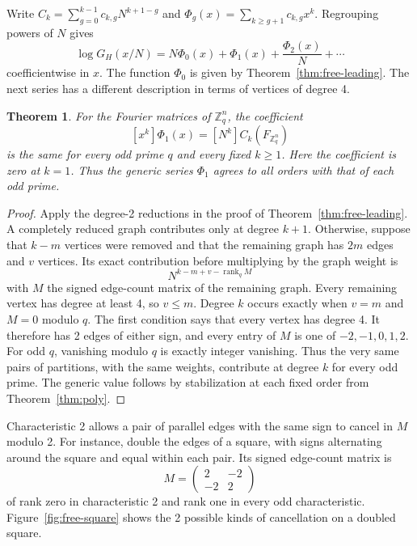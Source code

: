\documentclass[11pt,a4paper]{article}
\newtheorem{thm}{Theorem}[section]
\theoremstyle{remark}
\begin{document}
Write $C_k=\sum_{g=0}^{k-1}c_{k,g}N^{k+1-g}$ and
$\Phi_g(x)=\sum_{k\geq g+1}c_{k,g}x^k$. Regrouping powers of $N$ gives
\[
 \log G_H(x/N)=N\Phi_0(x)+\Phi_1(x)+\frac{\Phi_2(x)}N+\cdots
\]
coefficientwise in $x$. The function $\Phi_0$ is given by
Theorem~\ref{thm:free-leading}. The next series has a different
description in terms of vertices of degree 4.

\begin{samepage}
\begin{thm}\label{thm:free-odd}
For the Fourier matrices of $\mathbb Z_q^n$, the coefficient
\[
 [x^k]\Phi_1(x)=[N^k]C_k(F_{\mathbb Z_q^n})
\]
is the same for every odd prime $q$ and every fixed $k\geq1$.
Here the coefficient is zero at $k=1$. Thus the generic series $\Phi_1$
agrees to all orders with that of each odd prime.
\end{thm}
\end{samepage}
\begin{proof}
Apply the degree-2 reductions in the proof of
Theorem~\ref{thm:free-leading}. A completely reduced graph contributes
only at degree $k+1$. Otherwise, suppose that $k-m$ vertices were removed
and that the remaining graph has $2m$ edges and $v$ vertices. Its exact
contribution before multiplying by the graph weight is
\[
 N^{k-m+v-\operatorname{rank}_q M}
\]
with $M$ the signed edge-count matrix of the remaining graph.
Every remaining vertex has degree at least 4, so $v\leq m$.
Degree $k$ occurs exactly when $v=m$ and $M=0$ modulo $q$.
The first condition says that every vertex has degree 4. It therefore
has 2 edges of either sign, and every entry of $M$ is one of
$-2,-1,0,1,2$. For odd $q$, vanishing modulo $q$ is exactly integer
vanishing. Thus the very same pairs of partitions, with the same weights,
contribute at degree $k$ for every odd prime. The generic value follows
by stabilization at each fixed order from Theorem~\ref{thm:poly}.
\end{proof}

Characteristic 2 allows a pair of parallel edges with the same sign
to cancel in $M$ modulo 2. For instance, double the edges of a square,
with signs alternating around the square and equal within each pair.
Its signed edge-count matrix is
\[
 M=\begin{pmatrix}2&-2\\-2&2\end{pmatrix}
\]
of rank zero in characteristic 2 and rank one in every odd
characteristic. Figure~\ref{fig:free-square} shows the 2 possible kinds of
cancellation on a doubled square.
\end{document}
